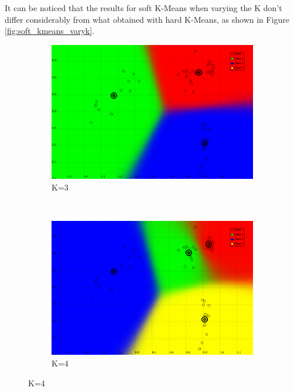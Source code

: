 \documentclass[a4paper,10pt]{article}
\begin{document}
It can be noticed that the results for soft K-Means when varying the K don't differ considerably from what obtained with hard K-Means, as shown in Figure \ref{fig:soft_kmeans_varyk}.

\begin{figure}[H]
\centering
    \begin{subfigure}[t]{0.2\textwidth}
      \centering
      \includegraphics[width=\textwidth]{pictures/dataset_1_soft-Kmeans-3K-beta30}
      \caption{K=3}
      \label{fig:dataset_1_soft-Kmeans-3K-beta30}
     \end{subfigure}
      ~
    \begin{subfigure}[t]{0.2\textwidth}
      \centering
      \includegraphics[width=\textwidth]{pictures/dataset_1_soft-Kmeans-4K-beta30-2}
      \caption{K=4}
      \label{fig:dataset_1_soft-Kmeans-4K-beta30-2}
     \end{subfigure}

\end{figure}
\end{document}
